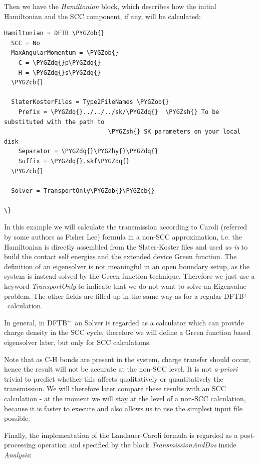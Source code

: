 \documentclass[a4paper,11pt,english]{sphinxmanual}
\newcommand{\dftbp}{\textsf{DFTB$^{\text{+}}$\ }} %
\def\PYGZob{\char`\{}
\def\PYGZcb{\char`\}}
\def\PYGZsh{\char`\#}
\def\PYGZhy{\char`\-}
\def\PYGZdq{\char`\"}
\begin{document}
{{Then we have the \emph{Hamiltonian} block, which describes how the initial
Hamiltonian and the SCC component, if any, will be calculated:

\begin{Verbatim}[commandchars=\\\{\}]
Hamiltonian = DFTB \PYGZob{}
  SCC = No
  MaxAngularMomentum = \PYGZob{}
    C = \PYGZdq{}p\PYGZdq{}
    H = \PYGZdq{}s\PYGZdq{}
  \PYGZcb{}

  SlaterKosterFiles = Type2FileNames \PYGZob{}
    Prefix = \PYGZdq{}../../../sk/\PYGZdq{}  \PYGZsh{} To be substituted with the path to
                             \PYGZsh{} SK parameters on your local disk
    Separator = \PYGZdq{}\PYGZhy{}\PYGZdq{}
    Suffix = \PYGZdq{}.skf\PYGZdq{}
  \PYGZcb{}

  Solver = TransportOnly\PYGZob{}\PYGZcb{}

\}
\end{Verbatim}

In this example we will calculate the transmission according to Caroli
(referred by some authors as Fisher Lee) formula in a non-SCC
approximation, i.e. the Hamiltonian is directly assembled from the
Slater-Koster files and used \emph{as is} to build the contact self
energies and the extended device Green function.  The definition of
an eigensolver is not meaningful in an open boundary setup, as the
system is instead solved by the Green function technique. Therefore
we just use a keyword \emph{TransportOnly} to indicate that we do not want
to solve an Eigenvalue problem. The other fields are filled up in the
same way as for a regular \dftbp calculation.

In general, in \dftbp an Solver is regarded as a calculator
which can provide charge density in the SCC cycle, therefore we will
define a Green function based eigensolver later, but only for SCC
calculations.

Note that as C-H bonds are present in the system, charge transfer
should occur, hence the result will not be accurate at the non-SCC
level. It is not \emph{a-priori} trivial to predict whether this affects
qualitatively or quantitatively the transmission. We will therefore
later compare these results with an SCC calculation - at the moment we
will stay at the level of a non-SCC calculation, because it is faster
to execute and also allows us to use the simplest input file possible.

Finally, the implementation of the Landauer-Caroli formula is regarded
as a post-processing operation and specified by the block
\emph{TransmissionAndDos} inside \emph{Analysis}:

}}
\end{document}
